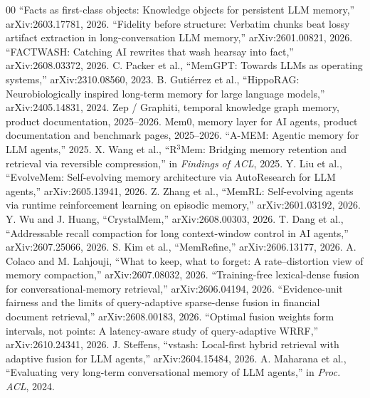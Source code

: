 \documentclass[conference]{IEEEtran}
\begin{document}
\begin{thebibliography}{00}
 ``Facts as first-class objects: Knowledge objects for persistent LLM memory,'' arXiv:2603.17781, 2026.
 ``Fidelity before structure: Verbatim chunks beat lossy artifact extraction in long-conversation LLM memory,'' arXiv:2601.00821, 2026.
 ``FACTWASH: Catching AI rewrites that wash hearsay into fact,'' arXiv:2608.03372, 2026.
 C. Packer et al., ``MemGPT: Towards LLMs as operating systems,'' arXiv:2310.08560, 2023.
 B. Guti\'errez et al., ``HippoRAG: Neurobiologically inspired long-term memory for large language models,'' arXiv:2405.14831, 2024.
 Zep / Graphiti, temporal knowledge graph memory, product documentation, 2025--2026.
 Mem0, memory layer for AI agents, product documentation and benchmark pages, 2025--2026.
 ``A-MEM: Agentic memory for LLM agents,'' 2025.
 X. Wang et al., ``R$^3$Mem: Bridging memory retention and retrieval via reversible compression,'' in \emph{Findings of ACL}, 2025.
 Y. Liu et al., ``EvolveMem: Self-evolving memory architecture via AutoResearch for LLM agents,'' arXiv:2605.13941, 2026.
 Z. Zhang et al., ``MemRL: Self-evolving agents via runtime reinforcement learning on episodic memory,'' arXiv:2601.03192, 2026.
 Y. Wu and J. Huang, ``CrystalMem,'' arXiv:2608.00303, 2026.
 T. Dang et al., ``Addressable recall compaction for long context-window control in AI agents,'' arXiv:2607.25066, 2026.
 S. Kim et al., ``MemRefine,'' arXiv:2606.13177, 2026.
 A. Colaco and M. Lahjouji, ``What to keep, what to forget: A rate--distortion view of memory compaction,'' arXiv:2607.08032, 2026.
 ``Training-free lexical-dense fusion for conversational-memory retrieval,'' arXiv:2606.04194, 2026.
 ``Evidence-unit fairness and the limits of query-adaptive sparse-dense fusion in financial document retrieval,'' arXiv:2608.00183, 2026.
 ``Optimal fusion weights form intervals, not points: A latency-aware study of query-adaptive WRRF,'' arXiv:2610.24341, 2026.
 J. Steffens, ``vstash: Local-first hybrid retrieval with adaptive fusion for LLM agents,'' arXiv:2604.15484, 2026.
 A. Maharana et al., ``Evaluating very long-term conversational memory of LLM agents,'' in \emph{Proc. ACL}, 2024.
\end{thebibliography}
\end{document}
